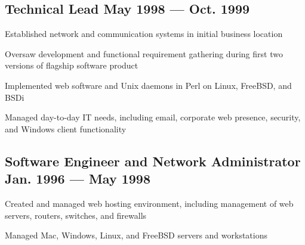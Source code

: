 \documentclass[letter,10pt]{article}
\begin{document}
\subsection{Technical Lead \hfill \textrm{\textmd{May 1998 --- Oct. 1999}}}
\begin{zitemize}
	\item Established network and communication systems in initial
	business location
	\item Oversaw development and functional requirement gathering
	during first two versions of flagship software product
	\item Implemented web software and Unix daemons in Perl on
	Linux, FreeBSD, and BSDi
	\item Managed day-to-day IT needs, including email, corporate
	web presence, security, and Windows client functionality
\end{zitemize}

\subsection{Software Engineer and Network Administrator \hfill \textrm{\textmd{Jan. 1996 --- May 1998}}}
\begin{zitemize}
	\item Created and managed web hosting environment, including
	management of web servers, routers, switches, and firewalls
	\item Managed Mac, Windows, Linux, and FreeBSD servers and
	workstations
\end{zitemize}
\end{document}
